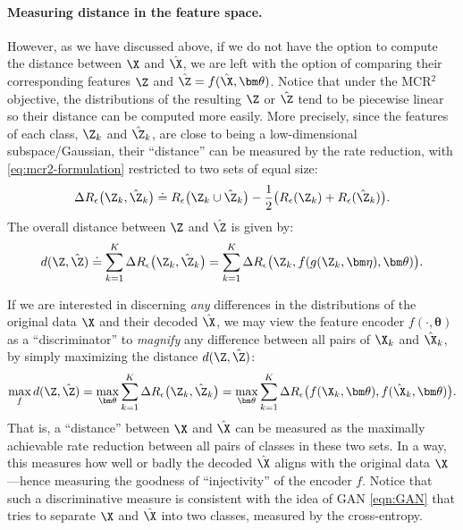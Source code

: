 \documentclass[../../book-main.tex]{subfiles}
\begin{document}
\paragraph{Measuring distance in the feature space.}
However, as we have discussed above, if we do not have the option to
compute the distance between $\X$ and $\hat \X$, we are left with the
option of comparing their corresponding features $\Z$ and $\hat \Z =
f(\hat \X, \bm \theta)$. Notice that under the MCR$^2$ objective, the
distributions of the resulting $\Z$ or $\hat \Z$ tend to be piecewise
linear so their distance can be computed more easily. More precisely,
since the features of each class, $\Z_k$ and $\hat{\Z}_k$, are close
to being a low-dimensional subspace/Gaussian, their ``distance'' can
be measured by the rate reduction, with \eqref{eq:mcr2-formulation}
restricted to two sets of equal size:
\begin{equation}
    \Delta R_\epsilon\big(\Z_k, \hat{\Z}_k\big) \doteq
    R_\epsilon\big(\Z_k \cup \hat{\Z}_k\big) - \frac{1}{2} \big(
    R_\epsilon(\Z_k) + R_\epsilon(\hat \Z_k)\big).
\end{equation}
The overall distance between $\Z$ and $\hat \Z$ is given by:
\begin{equation}
    d(\Z, \hat \Z) \doteq   \sum_{k=1}^K \Delta R_\epsilon\big(\Z_k,
    \hat{\Z}_k\big) =  \sum_{k=1}^K \Delta R_\epsilon\big(\Z_k,
    f(g(\Z_k, \bm\eta),\bm \theta)\big).
    \label{eqn:Z-distance}
\end{equation}

If we are interested in discerning {\em any} differences in the
distributions of the original data $\X$ and their decoded $\hat \X$,
we may view the feature encoder $f(\cdot, \bm \theta)$ as a
``discriminator'' to {\em magnify} any difference between all pairs
of $\X_k$ and $\hat \X_k$, by simply maximizing the distance $d(\Z, \hat \Z)$:
\begin{equation}
    \max_f d(\Z, \hat \Z) = \max_{\bm \theta} \sum_{k=1}^K \Delta
    R_\epsilon\big(\Z_k, \hat{\Z}_k\big) = \max_{\bm \theta}
    \sum_{k=1}^K \Delta R_\epsilon\big(f(\X_k,\bm \theta),
    f(\hat{\X}_k,\bm \theta)\big).
    \label{eqn:max-distance}
\end{equation}
That is, a ``distance'' between $\X$ and $\hat \X$ can be measured as
the maximally achievable rate reduction between all pairs of classes
in these two sets. In a way, this measures how well or badly the
decoded $\hat \X$ aligns with the original data $\X$---hence
measuring the goodness of ``injectivity'' of the encoder $f$. Notice
that such a discriminative measure is consistent with the idea of GAN
\eqref{eqn:GAN} that tries to separate $\X$ and $\hat \X$ into two
classes, measured by the cross-entropy.
\end{document}
